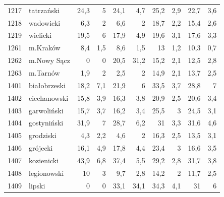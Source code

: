 \begin{center}
\begin{longtable}{lp{3cm}rrrrrrrr}
1217 & tatrzański              & 24,3    & 5           & 24,1     & 4,7          & 25,2     & 2,9          & 22,7     & 3,6          \\
1218 & wadowicki               & 6,3     & 2           & 6,6      & 2            & 18,7     & 2,2          & 15,4     & 2,6          \\
1219 & wielicki                & 19,5    & 6           & 17,9     & 4,9          & 19,6     & 3,1          & 17,6     & 3,3          \\
1261 & m.Kraków                & 8,4     & 1,5         & 8,6      & 1,5          & 13       & 1,2          & 10,3     & 0,7          \\
1262 & m.Nowy Sącz             & 0       & 0           & 20,5     & 31,2         & 15,2     & 2,1          & 12,5     & 2,8          \\
1263 & m.Tarnów                & 1,9     & 2           & 2,5      & 2            & 14,9     & 2,1          & 13,7     & 2,5          \\
1401 & białobrzeski            & 18,2    & 7,1         & 21,9     & 6            & 33,5     & 3,7          & 28,8     & 7            \\
1402 & ciechanowski            & 15,8    & 3,9         & 16,3     & 3,8          & 20,9     & 2,5          & 20,6     & 3,4          \\
1403 & garwoliński             & 15,7    & 3,7         & 16,2     & 3,4          & 25,5     & 3            & 24,5     & 3,1          \\
1404 & gostyniński             & 31,9    & 7           & 28,7     & 6,2          & 31       & 3,3          & 31,6     & 4,6          \\
1405 & grodziski               & 4,3     & 2,2         & 4,6      & 2            & 16,3     & 2,5          & 13,5     & 3,1          \\
1406 & grójecki                & 16,1    & 4,9         & 17,8     & 4,4          & 23,4     & 3            & 16,6     & 3,5          \\
1407 & kozienicki              & 43,9    & 6,8         & 37,4     & 5,5          & 29,2     & 2,8          & 31,7     & 3,8          \\
1408 & legionowski             & 10      & 3           & 9,7      & 2,8          & 14,2     & 2            & 11,7     & 2,5          \\
1409 & lipski                  & 0       & 0           & 33,1     & 34,1         & 34,3     & 4,1          & 31       & 6            \\

\end{longtable}
\end{center}
